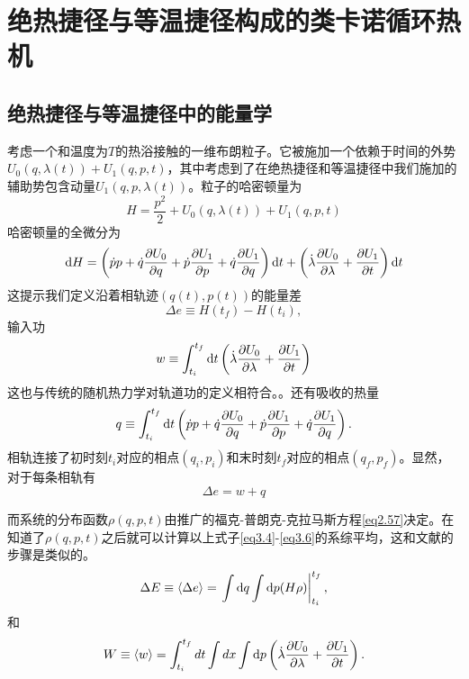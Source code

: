 \chapter{绝热捷径与等温捷径构成的类卡诺循环热机}
\section{绝热捷径与等温捷径中的能量学}

考虑一个和温度为$T$的热浴接触的一维布朗粒子。它被施加一个依赖于时间的外势$U_0 (q,\lambda(t)) + U_1 (q,p,t)$，其中考虑到了在绝热捷径和等温捷径中我们施加的辅助势包含动量$U_1 (q,p,\lambda(t))$。粒子的哈密顿量为
\begin{equation}
    H=\frac{p^{2}}{2}+U_0 (q,\lambda(t)) + U_1 (q,p,t)
    \label{eq3.1}
\end{equation}
哈密顿量的全微分为
\begin{equation}
    \mathrm{d} H=\left(\dot{p} p+\dot{q} \frac{\partial U_0}{\partial q} +  \dot{p} \frac{\partial U_1}{\partial p} + \dot{q} \frac{\partial U_1}{\partial q}  \right) \mathrm{d} t+\left(\dot{\lambda} \frac{\partial U_0}{\partial \lambda} + \frac{\partial U_1}{\partial t} \right) \mathrm{d} t
    \label{eq3.2}
\end{equation}
这提示我们定义沿着相轨迹$(q(t), p(t))$的能量差\cite{Tu2013}
\begin{equation}
     \Delta e \equiv H\left(t_{f}\right)-H\left(t_{i}\right),
     \label{eq3.3}
\end{equation}
输入功
\begin{equation}
    w \equiv \int_{t_{i}}^{t_{f}} \mathrm{d} t \left( \dot{\lambda} \frac{\partial U_0}{\partial \lambda} + \frac{\partial U_1}{\partial t} \right)
    \label{eq3.4}
\end{equation}
这也与传统的随机热力学对轨道功的定义相符合。\cite{Sekimoto2010,Jarzynski1997,Sekimoto_1997}。还有吸收的热量
\begin{equation}
    q \equiv \int_{t_{i}}^{t_{f}} \mathrm{d} t\left(\dot{p} p+\dot{q} \frac{\partial U_0}{\partial q} +  \dot{p} \frac{\partial U_1}{\partial p} + \dot{q} \frac{\partial U_1}{\partial q}  \right).
    \label{eq3.5}
\end{equation}
相轨连接了初时刻$t_i$对应的相点$(q_i , p_i )$和末时刻$t_f$对应的相点$(q_f , p_f )$。显然，对于每条相轨有
\begin{equation}
    \Delta e = w + q
    \label{eq3.6}
\end{equation}

而系统的分布函数$\rho (q,p,t)$由推广的福克-普朗克-克拉马斯方程\eqref{eq2.57}决定。在知道了$\rho (q,p,t)$之后就可以计算以上式子\eqref{eq3.4}-\eqref{eq3.6}的系综平均，这和文献\cite{Seifert2005,Shizume1995,Bizarro2011}的步骤是类似的。
\begin{equation}
    \Delta E \equiv\langle\Delta e\rangle=\left.\int \mathrm{d} q \int \mathrm{d} p(H \rho)\right|_{t_{i}} ^{t_{f}} ,
    \label{eq3.9}
\end{equation}
和
\begin{equation}
    W \equiv\langle w\rangle=\int_{t_{i}}^{t_{f}} d t \int d x \int \mathrm{d} p\left( \dot{\lambda} \frac{\partial U_0}{\partial \lambda} + \frac{\partial U_1}{\partial t} \right).
    \label{eq3.10}
\end{equation}


